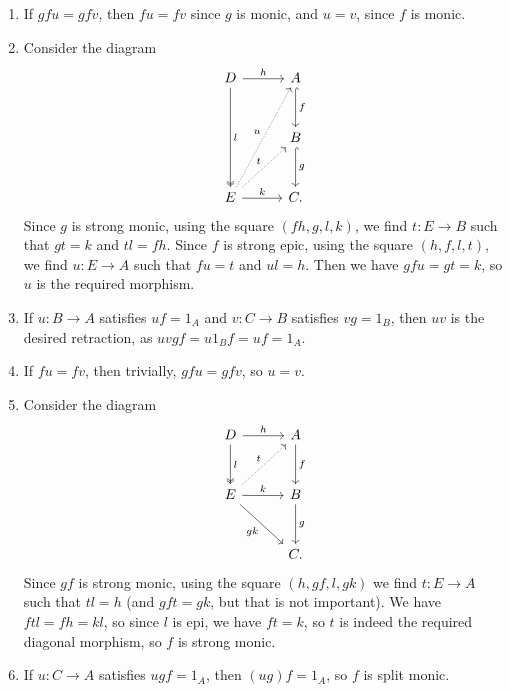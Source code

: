 \begin{enumerate}[label=(\alph*)]
	\item If $gfu = gfv$, then $fu = fv$ since $g$ is monic, and $u = v$, since
		$f$ is monic.
	\item Consider the diagram
		\[\begin{tikzcd}[row sep=1cm, column sep=1cm]
			D\ar[r, "h"]\ar[dd, two heads, "l"] & A\ar[d, "f", hook]\\
			& B\ar[d, "g", hook]\\
			E\ar[r, "k"]\ar[ur, "t", densely dotted]\ar[uur, "u", densely dotted]&C.
		\end{tikzcd}\]
		Since $g$ is strong monic, using the square $(fh, g, l, k)$,
		we find $t\colon E\to B$ such that
		$gt = k$ and $tl = fh$. Since $f$ is strong epic, using the square
		$(h, f, l, t)$, we find $u\colon E\to A$ such that $fu = t$ and $ul = h$.
		Then we have $gfu = gt = k$, so $u$ is the required morphism.
	\item If $u\colon B\to A$ satisfies $uf = 1_A$ and $v\colon C\to B$ satisfies
		$vg = 1_B$, then $uv$ is the desired retraction, as $uvgf= u1_Bf = uf = 1_A$.
	\item If $fu = fv$, then trivially, $gfu = gfv$, so $u = v$.
	\item Consider the diagram
		\[\begin{tikzcd}[row sep=1cm, column sep=1cm]
			D\ar[r, "h"]\ar[d, two heads, "l"] & A\ar[d, "f"]\\
			E\ar[ur, densely dotted, "t"]\ar[r, "k"]\ar[dr, "gk" below left] & B\ar[d, "g"]\\
			&C.
		\end{tikzcd}\]
		Since $gf$ is strong monic, using the square $(h, gf, l, gk)$ we find
		$t\colon E\to A$ such that $tl = h$ (and $gft = gk$, but that is not
		important). We have $ftl = fh = kl$, so since $l$ is epi, we have $ft = k$,
		so $t$ is indeed the required diagonal morphism, so  $f$ is strong monic.
	\item If  $u\colon C\to A$ satisfies $ugf = 1_A$, then $(ug)f = 1_A$, so
		$f$ is split monic.
\end{enumerate}
